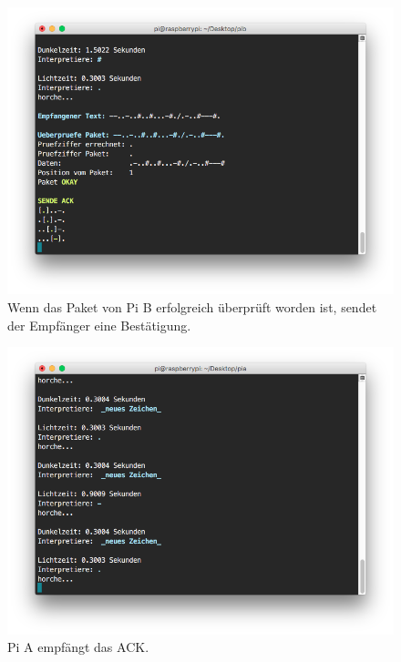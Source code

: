 \documentclass[12pt, a4paper]{article}
\begin{document}
\newpage
\begin{figure}[H]
	\centering
	\includegraphics[width=1.0\textwidth]{sshot_22.png}
	\caption{Wenn das Paket von Pi B erfolgreich überprüft worden ist, sendet der Empfänger eine Bestätigung.}
\end{figure}

\newpage
\begin{figure}[H]
	\centering
	\includegraphics[width=1.0\textwidth]{sshot_23.png}
	\caption{Pi A empfängt das ACK.}
\end{figure}
\end{document}
